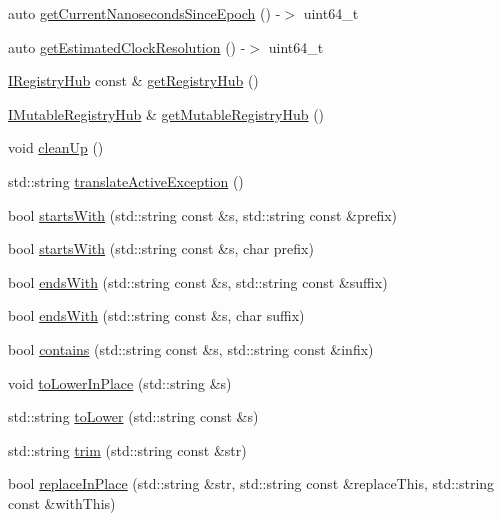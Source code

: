 \begin{DoxyCompactItemize}
\item 
auto \mbox{\hyperlink{namespace_catch_a98d058468488c486a9cb5c8463f3ba29}{get\+Current\+Nanoseconds\+Since\+Epoch}} () -\/$>$ uint64\+\_\+t
\item 
auto \mbox{\hyperlink{namespace_catch_ac8e1ed37624bd0d97b2c0d4ec099d31f}{get\+Estimated\+Clock\+Resolution}} () -\/$>$ uint64\+\_\+t
\item 
\mbox{\hyperlink{struct_catch_1_1_i_registry_hub}{I\+Registry\+Hub}} const  \& \mbox{\hyperlink{namespace_catch_a6332c92ab0c3952586b22cb96fdb8d44}{get\+Registry\+Hub}} ()
\item 
\mbox{\hyperlink{struct_catch_1_1_i_mutable_registry_hub}{I\+Mutable\+Registry\+Hub}} \& \mbox{\hyperlink{namespace_catch_ac9ddcc6d66079add9cb2a3140b8ae51e}{get\+Mutable\+Registry\+Hub}} ()
\item 
void \mbox{\hyperlink{namespace_catch_a0f78e9afdebc6d4512d18e76fbf54b8c}{clean\+Up}} ()
\item 
std\+::string \mbox{\hyperlink{namespace_catch_adafff91485eeeeb9e9333f317cc0e3b1}{translate\+Active\+Exception}} ()
\item 
bool \mbox{\hyperlink{namespace_catch_a695f62327be0676e046291eeaae15110}{starts\+With}} (std\+::string const \&s, std\+::string const \&prefix)
\item 
bool \mbox{\hyperlink{namespace_catch_acad23751846ac23d0f379e34f5adebb1}{starts\+With}} (std\+::string const \&s, char prefix)
\item 
bool \mbox{\hyperlink{namespace_catch_ada025504f627feaf9ac68ca391515dff}{ends\+With}} (std\+::string const \&s, std\+::string const \&suffix)
\item 
bool \mbox{\hyperlink{namespace_catch_afd801a3e33fd7a8b91ded0d02747a93f}{ends\+With}} (std\+::string const \&s, char suffix)
\item 
bool \mbox{\hyperlink{namespace_catch_aa52974b0e426e7e2fbd725a900e9c36e}{contains}} (std\+::string const \&s, std\+::string const \&infix)
\item 
void \mbox{\hyperlink{namespace_catch_a0760dbe87d090a55a35414db57d272c4}{to\+Lower\+In\+Place}} (std\+::string \&s)
\item 
std\+::string \mbox{\hyperlink{namespace_catch_ac036a17412d318598ffda8e1fe7a1177}{to\+Lower}} (std\+::string const \&s)
\item 
std\+::string \mbox{\hyperlink{namespace_catch_a084108b47f37d8bfd5db51c50c7451b3}{trim}} (std\+::string const \&str)
\item 
bool \mbox{\hyperlink{namespace_catch_afe4e6770da547e43e9e4eeaa05f946ea}{replace\+In\+Place}} (std\+::string \&str, std\+::string const \&replace\+This, std\+::string const \&with\+This)

\end{DoxyCompactItemize}
